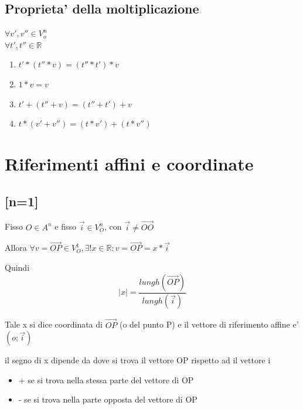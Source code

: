 \documentclass{article}
\begin{document}
\subsection{Proprieta' della moltiplicazione}
\begin{flushleft}
	$\forall v',v'' \in V_o^n$\\
	$\forall t',t'' \in \mathbb{R}$
\end{flushleft}
\begin{enumerate}
	\item $t' * (t''*v)=(t''*t')*v$
	\item $1*v=v$
	\item $t' + (t''+v)=(t''+t')+v$
	\item $t*(v'+v'')=(t*v')+(t*v'')$
\end{enumerate}
\section{Riferimenti affini e coordinate}
\subsection*{[n=1]}
\begin{flushleft}
	Fisso $O \in A^n$ e fisso $\overrightarrow{i} \in V^n_O$, con $\overrightarrow{i} \neq \overrightarrow{OO}$
\end{flushleft}
\begin{flushleft}
	Allora $ \forall v = \overrightarrow{OP} \in V^1_O,\exists ! x\in \mathbb{R}:v= \overrightarrow{OP} = x* \overrightarrow{i}$
\end{flushleft}
Quindi
\begin{equation*}
	|x|=\frac{lungh(\overrightarrow{OP})}{lungh(\overrightarrow{i})}
\end{equation*}
\begin{flushleft}
	Tale x si dice coordinata di $\overrightarrow{OP}$ (o del punto P) e il vettore di riferimento affine e' $(o;\overrightarrow{i})$
\end{flushleft}
\begin{flushleft}
	il segno di x dipende da dove si trova il vettore OP rispetto ad il vettore i
\end{flushleft}
\begin{itemize}
	\item + se si trova nella stessa parte del vettore di OP
	\item - se si trova nella parte opposta del vettore di OP
\end{itemize}
\end{document}
